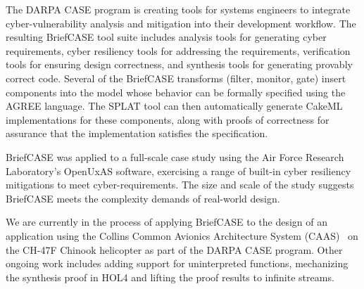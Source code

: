 The DARPA CASE program is creating tools for systems engineers to integrate cyber-vulnerability analysis and mitigation into their development workflow. The resulting BriefCASE tool suite includes analysis tools for generating cyber requirements, cyber resiliency tools for addressing the requirements, verification tools for ensuring design correctness, and synthesis tools for generating provably correct code. Several of the BriefCASE transforms (filter, monitor, gate) insert components into the model whose behavior can be formally specified using the AGREE language.
The SPLAT tool can then automatically generate CakeML implementations for these components, along with proofs of correctness for assurance that the implementation satisfies the specification.

BriefCASE was applied to a full-scale case study using the Air Force Research Laboratory's OpenUxAS software, exercising a range of built-in cyber resiliency mitigations to meet cyber-requirements. 
The size and scale of the study suggests BriefCASE meets the complexity demands of real-world design.

We are currently in the process of applying BriefCASE to the design of an application using the Collins Common Avionics Architecture System (CAAS)~\cite{caas} on the CH-47F Chinook helicopter as part of the DARPA CASE program.  Other ongoing work includes adding support for uninterpreted functions, mechanizing the synthesis proof in HOL4 and lifting the proof results to infinite streams.
